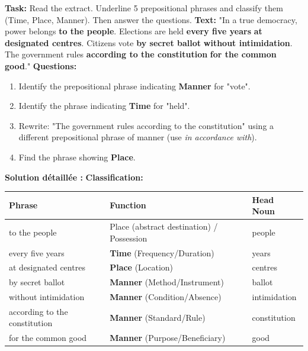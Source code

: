 \documentclass[11pt]{article}
\begin{document}
\begin{exoresolu}
    \textbf{Task:} Read the extract. Underline 5 prepositional phrases and classify them (Time, Place, Manner). Then answer the questions.
    \vspace{0.2cm}
    \textbf{Text:} "In a true democracy, power belongs \textbf{to the people}. Elections are held \textbf{every five years} \textbf{at designated centres}. Citizens vote \textbf{by secret ballot} \textbf{without intimidation}. The government rules \textbf{according to the constitution} \textbf{for the common good}."
    \vspace{0.2cm}
    \textbf{Questions:}
    \begin{enumerate}
        \item Identify the prepositional phrase indicating \textbf{Manner} for "vote".
        \item Identify the phrase indicating \textbf{Time} for "held".
        \item Rewrite: "The government rules according to the constitution" using a different prepositional phrase of manner (use \emph{in accordance with}).
        \item Find the phrase showing \textbf{Place}.
    \end{enumerate}
    \tcblower
    \textbf{Solution détaillée :}
    \textbf{Classification:}
    \begin{center}
        \begin{tabularx}{\linewidth}{|l|X|l|}\hline
            \textbf{Phrase} & \textbf{Function} & \textbf{Head Noun} \\ \hline
            to the people & Place (abstract destination) / Possession & people \\
            every five years & \textbf{Time} (Frequency/Duration) & years \\
            at designated centres & \textbf{Place} (Location) & centres \\
            by secret ballot & \textbf{Manner} (Method/Instrument) & ballot \\
            without intimidation & \textbf{Manner} (Condition/Absence) & intimidation \\
            according to the constitution & \textbf{Manner} (Standard/Rule) & constitution \\
            for the common good & \textbf{Manner} (Purpose/Beneficiary) & good \\ \hline
        \end{tabularx}

\end{center}
\end{exoresolu}
\end{document}
